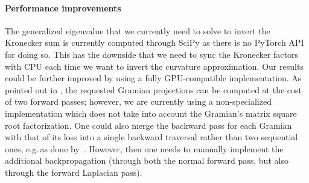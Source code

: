 \paragraph{Performance improvements} The generalized eigenvalue that we currently need to solve to invert the Kronecker sum is currently computed through SciPy as there is no PyTorch API for doing so. This has the downside that we need to sync the Kronecker factors with CPU each time we want to invert the curvature approximation. Our results could be further improved by using a fully GPU-compatible implementation.
As pointed out in \citep{martens2015optimizing}, the requested Gramian projections can be computed at the cost of two forward passes; however, we are currently using a non-specialized implementation which does not take into account the Gramian's matrix square root factorization.
One could also merge the backward pass for each Gramian with that of its loss into a single backward traversal rather than two sequential ones, e.g.\,as done by~\cite{dangel2020backpack}.
However, then one needs to manually implement the additional backpropagation (through both the normal forward pass, but also through the forward Laplacian pass).







